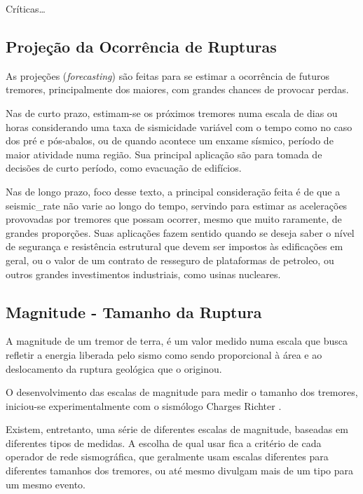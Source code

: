 Críticas\ldots

 
\subsection{Projeção da Ocorrência de Rupturas}
\label{sec:fundamentos}

As projeções (\textit{forecasting}) são feitas para se estimar a ocorrência de futuros tremores,
principalmente dos maiores, com grandes chances de provocar perdas.

Nas de curto prazo, estimam-se os próximos tremores
numa escala de dias ou horas considerando uma taxa de sismicidade variável 
com o tempo como no caso dos pré e pós-abalos, ou de quando 
acontece um enxame sísmico, período de maior atividade numa região.
Sua principal aplicação são para tomada de decisões de curto período, 
como evacuação de edifícios.

Nas de longo prazo, foco desse texto, a principal consideração feita é de que a 
\gls{seismic_rate} não varie ao longo do tempo, servindo para estimar as acelerações 
provovadas por tremores que possam ocorrer,
mesmo que muito raramente, de grandes proporções. Suas aplicações fazem sentido quando
se deseja saber o nível de segurança e resistência estrutural que devem ser impostos 
às edificações em geral, ou o valor de um contrato de resseguro de plataformas de petroleo,
ou outros grandes investimentos industriais, como usinas nucleares.

 
\subsection{Magnitude - Tamanho da Ruptura}
\label{sec:risco_sismico}

A magnitude de um tremor de terra, é um valor medido numa escala que busca
refletir a energia liberada pelo sismo como sendo proporcional à área
e ao deslocamento da ruptura geológica que o originou.

O desenvolvimento das escalas de magnitude para medir o tamanho dos tremores,
iniciou-se experimentalmente com o sismólogo Charges Richter \citep{richter_1935}.

Existem, entretanto, uma série de diferentes escalas de magnitude,
baseadas em diferentes tipos de medidas. A escolha de qual usar fica a critério
de cada operador de rede sismográfica, que geralmente usam escalas diferentes
para diferentes tamanhos dos tremores, ou até mesmo divulgam mais de um tipo para
um mesmo evento.

